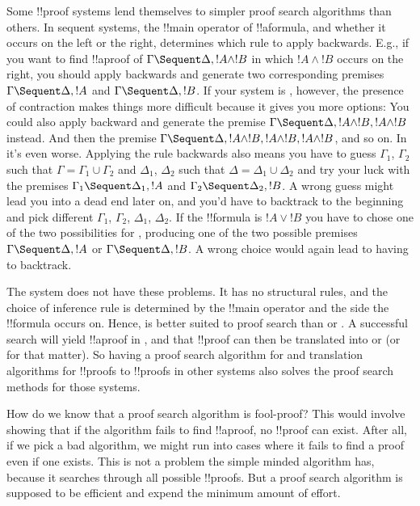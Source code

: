 \documentclass[../../../include/open-logic-section]{subfiles}
\begin{document}
Some !!{proof} systems lend themselves to simpler proof search
algorithms than others. In sequent systems, the !!{main operator} of
!!a{formula}, and whether it occurs on the left or the right,
determines which rule to apply backwards. E.g., if you want to find
!!a{proof} of $\Gamma \Sequent \Delta, !A \land !B$ in which $!A \land
!B$ occurs on the right, you should apply \RightR{\land} backwards and
generate two corresponding premises $\Gamma \Sequent \Delta, !A$ and
$\Gamma \Sequent \Delta, !B$. If your system is , however,
the presence of contraction makes things more difficult because it
gives you more options: You could also apply \RightR{\Contraction}
backward and generate the premise $\Gamma \Sequent \Delta, !A \land
!B, !A \land !B$ instead. And then the premise $\Gamma \Sequent
\Delta, !A \land !B, !A \land !B, !A \land !B$, and so on. In
 it's even worse. Applying the rule \RightR{\land} backwards
also means you have to guess $\Gamma_1$, $\Gamma_2$ such that $\Gamma
= \Gamma_1 \cup \Gamma_2$ and $\Delta_1$, $\Delta_2$ such that $\Delta
= \Delta_1 \cup \Delta_2$ and try your luck with the premises
$\Gamma_1 \Sequent \Delta_1, !A$ and $\Gamma_2 \Sequent \Delta_2, !B$.
A wrong guess might lead you into a dead end later on, and you'd have
to backtrack to the beginning and pick different $\Gamma_1$,
$\Gamma_2$, $\Delta_1$, $\Delta_2$. If the !!{formula} is $!A \lor !B$
you have to chose one of the two possibilities for \RightR{\lor},
producing one of the two possible premises $\Gamma \Sequent \Delta,
!A$ or $\Gamma \Sequent \Delta, !B$. A wrong choice would again lead
to having to backtrack.

The system  does not have these problems. It has no
structural rules, and the choice of inference rule is determined by
the !!{main operator} and the side the !!{formula} occurs on. Hence,
 is better suited to proof search than  or
. A successful search will yield !!a{proof} in , and
that !!{proof} can then be translated into  or  (or
 for that matter). So having a proof search algorithm for
 and translation algorithms for  !!{proof}s to
!!{proof}s in other systems also solves the proof search methods for
those systems.

How do we know that a proof search algorithm is fool-proof? This would
involve showing that if the algorithm fails to find !!a{proof}, no
!!{proof} can exist. After all, if we pick a bad algorithm, we might
run into cases where it fails to find a proof even if one exists. This
is not a problem the simple minded algorithm has, because it searches
through all possible !!{proof}s. But a proof search algorithm is
supposed to be efficient and expend the minimum amount of effort.
\end{document}
